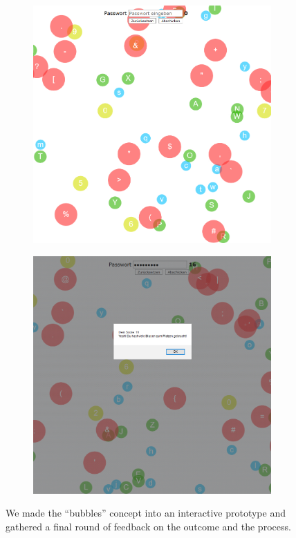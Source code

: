 \begin{figure}
	\centering
	\begin{subfigure}[!t]{0.49\textwidth}
		\includegraphics[width=\textwidth]{figures/co-design/bubbles-proto-1}
		\caption{\label{fig:co-design:bubbles-proto-1}}
	\end{subfigure}
	\begin{subfigure}[!t]{0.49\textwidth}
		\includegraphics[width=\textwidth]{figures/co-design/bubbles-proto-2}
		\caption{\label{fig:co-design:bubbles-proto-2}}
	\end{subfigure}
	\caption{\label{fig:co-design:bubbles-proto} We made the ``bubbles'' concept into an interactive prototype and gathered a final round of feedback on the outcome and the process.} 
\end{figure}

